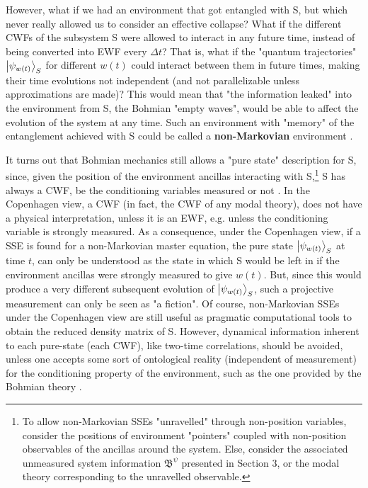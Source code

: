 \documentclass[11pt, a4paper]{article} %
\newcommand{\B}{\mathfrak{B}}
\begin{document}
However, what if we had an environment that got entangled with S, but which never really allowed us to consider an effective collapse? What if the different CWFs of the subsystem S were allowed to interact in any future time, instead of being converted into EWF every $\Delta t$? That is, what if the "quantum trajectories" $\ket{\psi_{w(t)}}_S$ for different $w(t)$ could interact between them in future times, making their time evolutions not independent (and not parallelizable unless approximations are made)? This would mean that "the information leaked" into the environment from S, the Bohmian "empty waves", would be able to affect the evolution of the system at any time. Such an environment with "memory" of the entanglement achieved with S could be called a {\bf non-Markovian} environment \cite{MarkovianityDefs}. 

It turns out that Bohmian mechanics still allows a "pure state" description for S, since, given the position of the environment ancillas interacting with S,\footnote{To allow non-Markovian SSEs "unravelled" through non-position variables, consider the positions of environment "pointers" coupled with non-position observables of the ancillas around the system. Else, consider the associated unmeasured system information $\B^\psi$ presented in Section 3, or the modal theory corresponding to the unravelled observable.} S has always a CWF, be the conditioning variables measured or not \cite{NMisModal, interpretSSE}. In the Copenhagen view, a CWF (in fact, the CWF of any modal theory), does not have a physical interpretation, unless it is an EWF, e.g. unless the conditioning variable is strongly measured. As a consequence, under the Copenhagen view, if a SSE is found for a non-Markovian master equation, the pure state $\ket{\psi_{w(t)}}_S$ at time $t$, can only be understood as the state in which S would be left in if the environment ancillas were strongly measured to give $w(t)$. But, since this would produce a very different subsequent evolution of $\ket{\psi_{w(t)}}_S$, such a projective measurement can only be seen as "a fiction". Of course, non-Markovian SSEs under the Copenhagen view are still useful as pragmatic computational tools to obtain the reduced density matrix of S. However, dynamical information inherent to each pure-state (each CWF), like two-time correlations, should be avoided, unless one accepts some sort of ontological reality (independent of measurement) for the conditioning property of the environment, such as the one provided by the Bohmian theory \cite{NMisModal, interpretSSE}.
\end{document}
